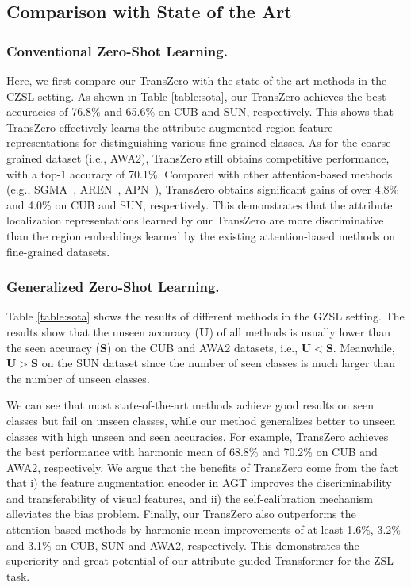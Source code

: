 \documentclass[letterpaper]{article} %
\begin{document}
	
	\subsection{Comparison with State of the Art}\label{sec4.1}	
	
	\subsubsection{Conventional Zero-Shot Learning.} Here, we first compare our TransZero with the state-of-the-art methods in the CZSL setting. As shown in Table \ref{table:sota}, our TransZero achieves the best accuracies of 76.8\% and 65.6\% on CUB and SUN, respectively. This shows that TransZero effectively learns the attribute-augmented region feature representations for distinguishing various fine-grained classes.  As for the coarse-grained dataset (i.e., AWA2), TransZero still obtains competitive performance, with a top-1 accuracy of 70.1\%. Compared with other attention-based methods (e.g., SGMA~\cite{Zhu2019SemanticGuidedML}, AREN~\cite{Xie2019AttentiveRE}, APN~\cite{Xu2020AttributePN}), TransZero obtains significant gains of over 4.8\% and 4.0\% on CUB and SUN, respectively. This demonstrates that the attribute localization representations learned by our TransZero are more discriminative than the region embeddings learned by the existing attention-based methods on fine-grained datasets. 
	
	
	
	\subsubsection{Generalized Zero-Shot Learning.}
	Table \ref{table:sota} shows the results of different methods in the GZSL setting. The results show that the unseen accuracy ($\bm{U}$) of all methods is usually lower than the seen accuracy ($\bm{S}$) on the CUB and AWA2 datasets, i.e., $\bm{U}<\bm{S}$. Meanwhile, $\bm{U}>\bm{S}$ on the SUN dataset since the number of seen classes is much larger than the number of unseen classes.
	
	We can see that most state-of-the-art methods achieve good results on seen classes but fail on unseen classes, while our method generalizes better to unseen classes with high unseen and seen accuracies.  For example, TransZero achieves the best performance with harmonic mean of 68.8\% and 70.2\% on CUB and AWA2, respectively. We argue that the benefits of TransZero come from the fact that i) the feature augmentation encoder in AGT improves the discriminability and transferability of visual features, and ii) the self-calibration mechanism alleviates the bias problem. Finally, our TransZero also outperforms the attention-based methods by harmonic mean improvements of at least 1.6\%, 3.2\% and 3.1\% on CUB, SUN and AWA2, respectively. This demonstrates the superiority and great potential of our attribute-guided Transformer for the ZSL task.
	
\end{document}

